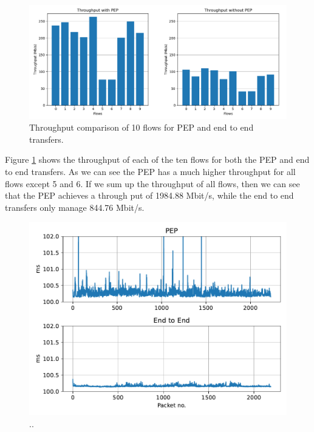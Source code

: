 \documentclass[a4paper,english, 11pt]{report}
\begin{document}
\begin{figure}[h!] %
	\centering
	\includegraphics[scale=0.40]{../diagrams/witestlab/tput_bars.png}
  	\caption{Throughput comparison of 10 flows for PEP and end to end transfers.}
  	\label{fig:witestlab_tput_bars}
\end{figure}

Figure \ref{fig:witestlab_tput_bars} shows the throughput of each of the ten flows for both the PEP and end to end transfers. As we can see the PEP has a much higher throughput for all flows except 5 and 6. If we sum up the throughput of all flows, then we can see that the PEP achieves a through put of 1984.88 Mbit/s, while the end to end transfers only manage 844.76 Mbit/s.

\begin{figure}[h!] %
	\centering
	\includegraphics[scale=0.50]{../diagrams/witestlab/tput_ping.pdf}
  	\caption{..}
  	\label{fig:witestlab_tput_ping}
\end{figure}
\end{document}
